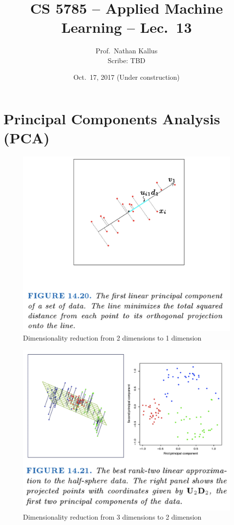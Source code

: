 \documentclass[a4paper]{article}
\title{CS 5785 -- Applied Machine Learning -- Lec.\ 13}
\author{Prof.\ Nathan Kallus \\Scribe: TBD}
\date{Oct.\ 17, 2017 (Under construction)}
\begin{document}
\maketitle

\section{Principal Components Analysis (PCA)}

\begin{figure}
\centering
\includegraphics[width=1.0\textwidth]{TwoDimReduction.png}
\caption{\label{fig:2DimReduction} Dimensionality reduction from 2 dimensions to 1 dimension}
\end{figure}


\begin{figure}
\centering
\includegraphics[width=1.0\textwidth]{ThreeDimReduction.png}
\caption{\label{fig:3DimReduction}Dimensionality reduction from 3 dimensions to 2 dimension}
\end{figure}
\end{document}
